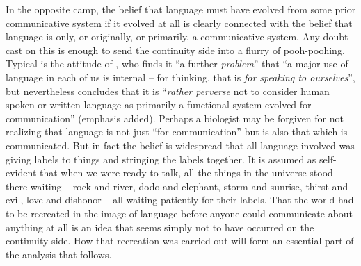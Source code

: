In the opposite camp, the belief that language must have evolved from some prior communicative system if it evolved at all is clearly connected with the belief that language is only, or originally, or pri\-marily, a communicative system. Any doubt cast on this is enough to send the continuity side into a flurry of pooh-poohing. Typical is the attitude of \citet[175]{Young1978}, who finds it ``a further \textit{problem}'' that ``a major use of language in each of us is internal -- for thinking, that is \textit{for speaking to ourselves}'', but nevertheless concludes that it is ``\textit{rather perverse} not to consider human spoken or written language as primarily a functional system evolved for communication'' (emphasis added). Perhaps a biologist may be forgiven for not realizing that language is not just ``for communication'' but is also that which is communicated. But in fact the belief is widespread that all language in\-volved was giving labels to things and stringing the labels together. It is assumed as self-evident that when we were ready to talk, all the things in the universe stood there waiting -- rock and river, dodo and elephant, storm and sunrise, thirst and evil, love and dishonor -- all waiting patiently for their labels. That the world had to be recreated in the image of language before anyone could communicate about anything at all is an idea that seems simply not to have occurred on the continuity side. How that recreation was carried out will form an essential part of the analysis that follows.

